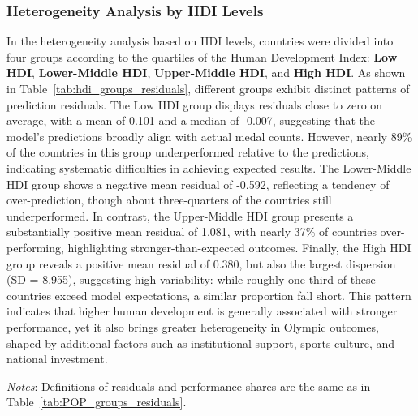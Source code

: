 \documentclass[11pt,twoside]{article}
\numberwithin{Theorem}{section}
\numberwithin{Definition}{section}
\numberwithin{Lemma}{section}
\numberwithin{Algorithm}{section}
\numberwithin{equation}{section}
\begin{document}
\subsubsection{Heterogeneity Analysis by HDI Levels}

In the heterogeneity analysis based on HDI levels, countries were divided into four groups according to the quartiles of the Human Development Index: \textbf{Low HDI}, \textbf{Lower-Middle HDI}, \textbf{Upper-Middle HDI}, and \textbf{High HDI}. As shown in Table~\ref{tab:hdi_groups_residuals}, different groups exhibit distinct patterns of prediction residuals. The Low HDI group displays residuals close to zero on average, with a mean of 0.101 and a median of -0.007, suggesting that the model's predictions broadly align with actual medal counts. However, nearly 89\% of the countries in this group underperformed relative to the predictions, indicating systematic difficulties in achieving expected results. The Lower-Middle HDI group shows a negative mean residual of -0.592, reflecting a tendency of over-prediction, though about three-quarters of the countries still underperformed. In contrast, the Upper-Middle HDI group presents a substantially positive mean residual of 1.081, with nearly 37\% of countries over-performing, highlighting stronger-than-expected outcomes. Finally, the High HDI group reveals a positive mean residual of 0.380, but also the largest dispersion (SD = 8.955), suggesting high variability: while roughly one-third of these countries exceed model expectations, a similar proportion fall short. This pattern indicates that higher human development is generally associated with stronger performance, yet it also brings greater heterogeneity in Olympic outcomes, shaped by additional factors such as institutional support, sports culture, and national investment.


\begin{table}[htbp]
\centering
\caption{Prediction residuals by HDI groups}
\par\vspace{6pt}
\begin{minipage}{0.95\linewidth}
\footnotesize
\raggedright
\footnotesize
\textit{Notes}: Definitions of residuals and performance shares are the same as in Table~\ref{tab:POP_groups_residuals}.
\end{minipage}
\end{table}
\end{document}
